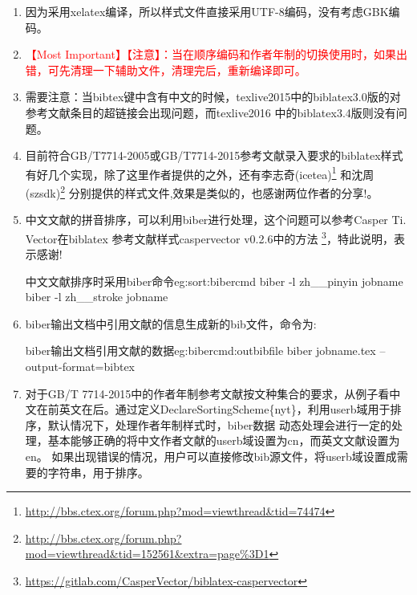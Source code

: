 \begin{enumerate}
  \item 因为采用xelatex编译，所以样式文件直接采用UTF-8编码，没有考虑GBK编码。

  \item \textcolor{red}{\HandRight \heiti 【Most Important】【注意】：当在顺序编码和作者年制的切换使用时，如果出错，可先清理一下辅助文件，清理完后，重新编译即可。}

  \item 需要注意：当bibtex键中含有中文的时候，texlive2015中的biblatex3.0版的对参考文献条目的超链接会出现问题，而texlive2016 中的biblatex3.4版则没有问题。

  \item 目前符合GB/T7714-2005或GB/T7714-2015参考文献录入要求的biblatex样式有好几个实现，除了这里作者提供的之外，还有李志奇(icetea)\footnote{\url{http://bbs.ctex.org/forum.php?mod=viewthread&tid=74474}} 和沈周(szsdk)\footnote{\url{http://bbs.ctex.org/forum.php?mod=viewthread&tid=152561&extra=page\%3D1}} 分别提供的样式文件,效果是类似的，也感谢两位作者的分享!。

  \item {\heiti 中文文献的拼音排序，可以利用biber进行处理，这个问题可以参考Casper Ti. Vector在biblatex 参考文献样式caspervector v0.2.6中的方法
      \footnote{\url{https://gitlab.com/CasperVector/biblatex-caspervector}}，特此说明，表示感谢!}

        \begin{codetex}{中文文献排序时采用biber命令}{eg:sort:bibercmd}
        biber -l zh__pinyin jobname
        biber -l zh__stroke jobname
        \end{codetex}

  \item biber输出文档中引用文献的信息生成新的bib文件，命令为:
        \begin{codetex}{biber输出文档引用文献的数据}{eg:bibercmd:outbibfile}
        biber jobname.tex --output-format=bibtex
        \end{codetex}


  \item 对于GB/T 7714-2015中的作者年制参考文献按文种集合的要求，从例子看中文在前英文在后。通过定义DeclareSortingScheme\{nyt\}，利用userb域用于排序，默认情况下，处理作者年制样式时，biber数据
动态处理会进行一定的处理，基本能够正确的将中文作者文献的userb域设置为cn，而英文文献设置为en。
如果出现错误的情况，用户可以直接修改bib源文件，将userb域设置成需要的字符串，用于排序。


\end{enumerate}
